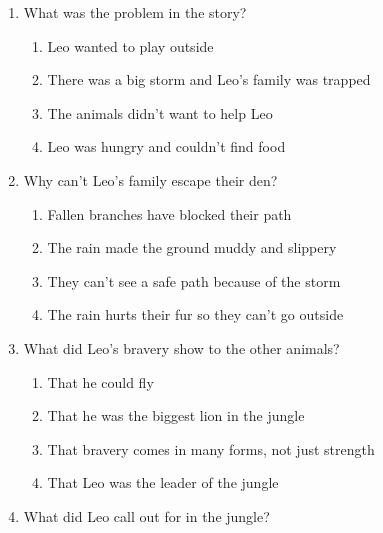 \documentclass[12pt]{article}
\begin{document}
\begin{enumerate}
    \vspace{0.5cm}

    \item What was the problem in the story?

    \begin{enumerate}[label=\Alph*.]
        \item Leo wanted to play outside
        \item There was a big storm and Leo's family was trapped
        \item The animals didn’t want to help Leo
        \item Leo was hungry and couldn’t find food
    \end{enumerate}

    \vspace{0.5cm}

    \item Why can't Leo's family escape their den?

    \begin{enumerate}[label=\Alph*.]
        \item Fallen branches have blocked their path
        \item The rain made the ground muddy and slippery
        \item They can't see a safe path because of the storm
        \item The rain hurts their fur so they can't go outside
    \end{enumerate}

    \vspace{0.5cm}

    \item What did Leo's bravery show to the other animals?

    \begin{enumerate}[label=\Alph*.]
        \item That he could fly
        \item That he was the biggest lion in the jungle
        \item That bravery comes in many forms, not just strength
        \item That Leo was the leader of the jungle
    \end{enumerate}

    \vspace{0.5cm}

    \item What did Leo call out for in the jungle?


\end{enumerate}
\end{document}
